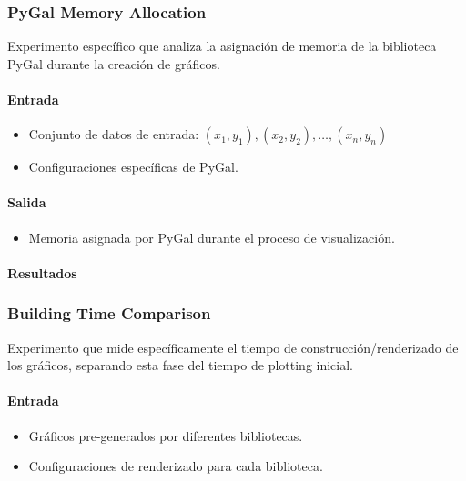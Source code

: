 \subsubsection{PyGal Memory Allocation}
\label{pygal_memory_allocation}

Experimento específico que analiza la asignación de memoria de la biblioteca PyGal durante la creación de gráficos.

\paragraph{Entrada}
\begin{itemize}
    \item Conjunto de datos de entrada: \( (x_1, y_1), (x_2, y_2), \ldots, (x_n, y_n) \)
    \item Configuraciones específicas de PyGal.
\end{itemize}

\paragraph{Salida}
\begin{itemize}
    \item Memoria asignada por PyGal durante el proceso de visualización.
\end{itemize}

\paragraph{Resultados}
\vspace{0.5em}
\noindent

\PyGalMemoryAllocation

\subsubsection{Building Time Comparison}
\label{building_time_comparison}

Experimento que mide específicamente el tiempo de construcción/renderizado de los gráficos, separando esta fase del tiempo de plotting inicial.

\paragraph{Entrada}
\begin{itemize}
    \item Gráficos pre-generados por diferentes bibliotecas.
    \item Configuraciones de renderizado para cada biblioteca.
\end{itemize}

